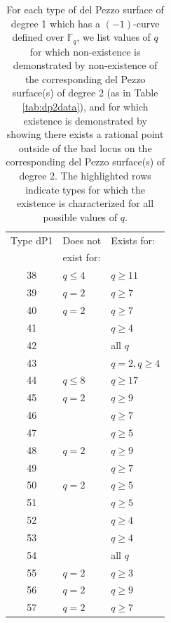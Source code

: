 \documentclass[a4paper, 11pt, reqno]{amsart}
\numberwithin{equation}{section} \numberwithin{figure}{section}
\def \F {{\mathbb F}}
\theoremstyle{definition}
\numberwithin{lemma}{section}
\begin{document}
\begin{table}[ht]
    \centering
        \caption{For each type of del Pezzo surface of degree 1 which has a $(-1)$-curve defined over $\F_q$, we list values of $q$ for which non-existence is demonstrated by non-existence of the corresponding del Pezzo surface(s) of degree 2 (as in Table \ref{tab:dp2data}), and for which existence is demonstrated by showing there exists a rational point outside of the bad locus on the corresponding del Pezzo surface(s) of degree 2. The highlighted rows indicate types for which the existence is characterized for all possible values of $q$.}
    \begin{minipage}{0.44\textwidth}
    \centering
        \begin{tabular}{|c|l|l|}
        \hline
            Type dP1 & Does not & Exists for:\\ 
            & exist for: & \\
            \hline
            38 & $q \leq 4$ & $q \geq 11$\\
            39 & $q = 2$ & $q \geq 7$\\
            40 & $q = 2 $ & $q \geq 7$\\
            41 & & $q \geq 4$\\
            \rowcolor{lightgray}
            42 & & all $q$\\
            43 & & $q = 2, q \geq 4$\\
            44 & $q \leq 8$ & $q \geq 17$\\
            45 & $q = 2 $ & $q \geq 9$\\
            46 & & $q \geq 7$\\
            47 & & $q \geq 5$\\
            48 & $q = 2 $ & $q \geq 9$\\
            49 & & $q \geq 7$\\
            50 & $q = 2 $ & $q \geq 5$\\
            51 & & $q \geq 5$\\
            52 & & $q \geq 4$\\
            53 & & $q \geq 4$\\
            \rowcolor{lightgray}
            54 & & all $q$\\
            \rowcolor{lightgray}
            55 & $q = 2 $ & $q \geq 3$\\
            56 & $q = 2 $ & $q \geq 9$\\
            57 & $q = 2 $ & $q \geq 7$\\

\end{tabular}
\end{minipage}
\end{table}
\end{document}
